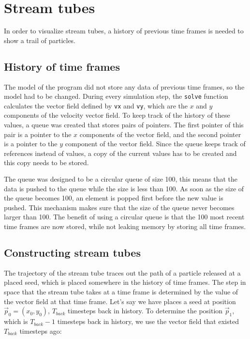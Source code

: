 \section{Stream tubes}
\label{sec:stream_tubes}
In order to visualize stream tubes, a history of previous time frames is needed to show a trail of particles.

\subsection{History of time frames}
The model of the program did not store any data of previous time frames, so the model had to be changed. 
During every simulation step, the \texttt{solve} function calculates the vector field defined by \texttt{vx} and \texttt{vy}, which are the \(x\) and \(y\) components of the velocity vector field.
To keep track of the history of these values, a queue was created that stores pairs of pointers.
The first pointer of this pair is a pointer to the \(x\) components of the vector field, and the second pointer is a pointer to the \(y\) component of the vector field.
Since the queue keeps track of references instead of values, a copy of the current values has to be created and this copy needs to be stored.

The queue was designed to be a circular queue of size 100, this means that the data is pushed to the queue while the size is less than 100.
As soon as the size of the queue becomes 100, an element is popped first before the new value is pushed.
This mechanism makes sure that the size of the queue never becomes larger than 100. 
The benefit of using a circular queue is that the 100 most recent time frames are now stored, while not leaking memory by storing all time frames.

\subsection{Constructing stream tubes}
The trajectory of the stream tube traces out the path of a particle released at a placed seed, which is placed somewhere in the history of time frames.
The step in space that the stream tube takes at a time frame is determined by the value of the vector field at that time frame.
Let's say we have places a seed at position \(\vec{p}_0 = \left(x_0, y_0\right)\), \(T_{back}\) timesteps back in history.
To determine the position \(\vec{p}_1\), which is \(T_{back} - 1\) timesteps back in history, we use the vector field that existed \(T_{back}\) timesteps ago:

